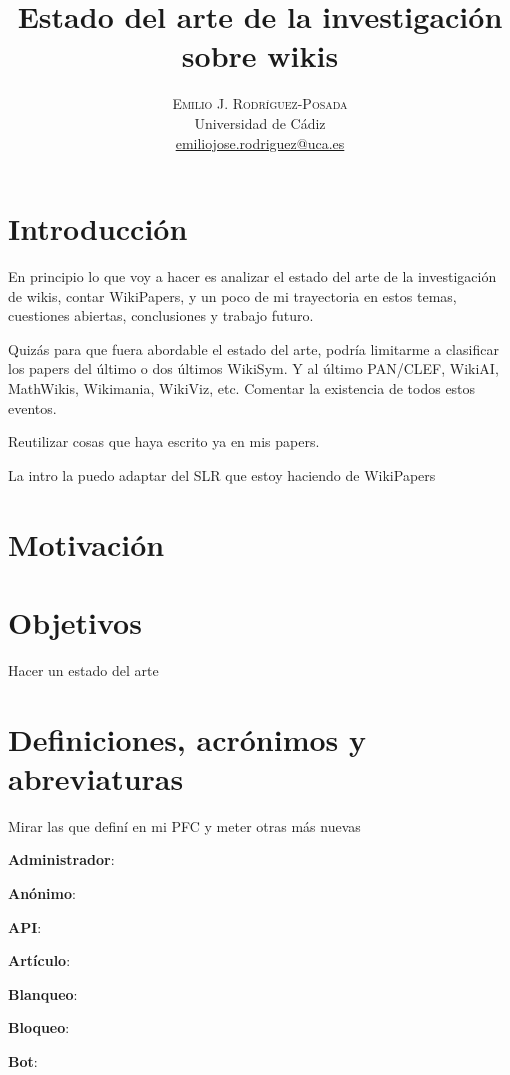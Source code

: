 \documentclass[11pt,onecolumn]{article}
\title{\vspace{-15mm}%
	\fontsize{24pt}{10pt}\selectfont
	\textbf{Estado del arte de la investigación sobre wikis}
	}
\author{%
	\large
	\textsc{Emilio J. Rodríguez-Posada} \\
	\normalsize	Universidad de Cádiz \\
	\normalsize	\href{mailto:emiliojose.rodriguez@uca.es}{emiliojose.rodriguez@uca.es}
	\vspace{-5mm}
	}
\date{}
\begin{document}
\maketitle

\begin{abstract}

\end{abstract}

\section{Introducción}

En principio lo que voy a hacer es analizar el estado del arte de la investigación de wikis, contar WikiPapers, y un poco de mi trayectoria en estos temas, cuestiones abiertas, conclusiones y trabajo futuro.

Quizás para que fuera abordable el estado del arte, podría limitarme a clasificar los papers del último o dos últimos WikiSym. Y al último PAN/CLEF, WikiAI, MathWikis, Wikimania, WikiViz, etc. Comentar la existencia de todos estos eventos.

Reutilizar cosas que haya escrito ya en mis papers.

La intro la puedo adaptar del SLR que estoy haciendo de WikiPapers

\section{Motivación}

\section{Objetivos}

Hacer un estado del arte


\section{Definiciones, acrónimos y abreviaturas}

Mirar las que definí en mi PFC y meter otras más nuevas

\textbf{Administrador}:

\textbf{Anónimo}:


\textbf{API}:

\textbf{Artículo}:

\textbf{Blanqueo}:

\textbf{Bloqueo}:

\textbf{Bot}:
\end{document}
